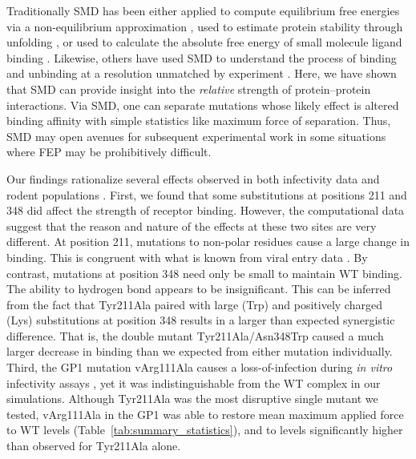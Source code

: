 \documentclass[12pt]{article}
\begin{document}
Traditionally SMD has been either applied to compute equilibrium free energies via a non-equilibrium approximation \citep{Park2003,Park2004,Giorgino2011}, used to estimate protein stability through unfolding \citep{Lu1999}, or used to calculate the absolute free energy of small molecule ligand binding \citep{Dixit2001}. Likewise, others have used SMD to understand the process of binding and unbinding at a resolution unmatched by experiment \citep{Cuendet2011,Giorgino2011}. Here, we have shown that SMD can provide insight into the \textit{relative} strength of protein--protein interactions. Via SMD, one can separate mutations whose likely effect is altered binding affinity with simple statistics like maximum force of separation. Thus, SMD may open avenues for subsequent experimental work in some situations where FEP may be prohibitively difficult.

Our findings rationalize several effects observed in both infectivity data and rodent populations \citep{Rad2008,Rad20111}. First, we found that some substitutions at positions 211 and 348 did affect the strength of receptor binding. However, the computational data suggest that the reason and nature of the effects at these two sites are very different. At position 211, mutations to non-polar residues cause a large change in binding. This is congruent with what is known from viral entry data \citep{Rad2008,Rad20111}. By contrast, mutations at position 348 need only be small to maintain WT binding. The ability to hydrogen bond appears to be insignificant. This can be inferred from the fact that Tyr211Ala paired with large (Trp) and positively charged (Lys) substitutions at position 348 results in a larger than expected synergistic difference. That is, the double mutant Tyr211Ala/Asn348Trp caused a much larger decrease in binding than we expected from either mutation individually. Third, the GP1 mutation vArg111Ala causes a loss-of-infection during \textit{in vitro} infectivity assays \citep{Rad20112}, yet it was indistinguishable from the WT complex in our simulations. Although Tyr211Ala was the most disruptive single mutant we tested, vArg111Ala in the GP1 was able to restore mean maximum applied force to WT levels (Table~\ref{tab:summary_statistics}), and to levels significantly higher than observed for Tyr211Ala alone.
\end{document}
